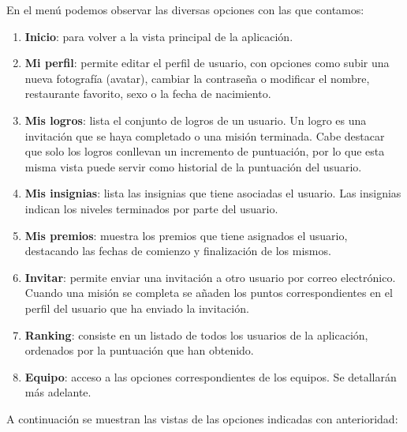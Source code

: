 \documentclass[twoside]{report}
\begin{document}
En el menú podemos observar las diversas opciones con las que contamos:
\begin{enumerate}
	\item \textbf{Inicio}: para volver a la vista principal de la aplicación.
	\item \textbf{Mi perfil}: permite editar el perfil de usuario, con opciones como subir una nueva fotografía (avatar), cambiar la contraseña o modificar el nombre, restaurante favorito, sexo o la fecha de nacimiento.
	\item \textbf{Mis logros}: lista el conjunto de logros de un usuario. Un logro es una invitación que se haya completado o una misión terminada. Cabe destacar que solo los logros conllevan un incremento de puntuación, por lo que esta misma vista puede servir como historial de la puntuación del usuario.
	\item \textbf{Mis insignias}: lista las insignias que tiene asociadas el usuario. Las insignias indican los niveles terminados por parte del usuario.
	\item \textbf{Mis premios}: muestra los premios que tiene asignados el usuario, destacando las fechas de comienzo y finalización de los mismos.
	\item \textbf{Invitar}: permite enviar una invitación a otro usuario por correo electrónico. Cuando una misión se completa se añaden los puntos correspondientes en el perfil del usuario que ha enviado la invitación.
	\item \textbf{Ranking}: consiste en un listado de todos los usuarios de la aplicación, ordenados por la puntuación que han obtenido.
	\item \textbf{Equipo}: acceso a las opciones correspondientes de los equipos. Se detallarán más adelante.
\end{enumerate}

A continuación se muestran las vistas de las opciones indicadas con anterioridad:
\end{document}
